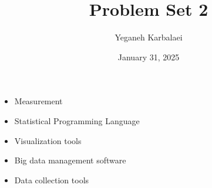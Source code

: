 \documentclass{article}
\title{Problem Set 2}
\author{Yeganeh Karbalaei}
\date{January 31, 2025}
\begin{document}
\maketitle

\begin{itemize}
    \item {\Large Measurement}
    \item {\Large Statistical Programming Language}
    \item {\Large Visualization tools} 
    \item {\Large Big data management software} 
    \item {\Large Data collection tools}
\end{itemize} 
\noindent\Large 
\end{document}
